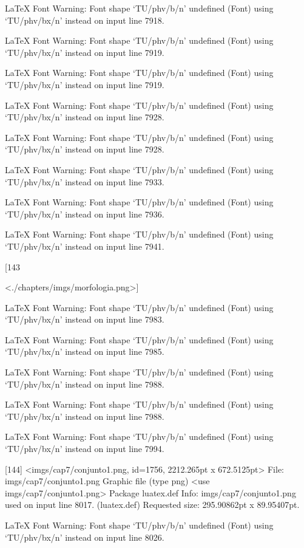 LaTeX Font Warning: Font shape `TU/phv/b/n' undefined
(Font)              using `TU/phv/bx/n' instead on input line 7918.


LaTeX Font Warning: Font shape `TU/phv/b/n' undefined
(Font)              using `TU/phv/bx/n' instead on input line 7919.


LaTeX Font Warning: Font shape `TU/phv/b/n' undefined
(Font)              using `TU/phv/bx/n' instead on input line 7919.


LaTeX Font Warning: Font shape `TU/phv/b/n' undefined
(Font)              using `TU/phv/bx/n' instead on input line 7928.


LaTeX Font Warning: Font shape `TU/phv/b/n' undefined
(Font)              using `TU/phv/bx/n' instead on input line 7928.


LaTeX Font Warning: Font shape `TU/phv/b/n' undefined
(Font)              using `TU/phv/bx/n' instead on input line 7933.


LaTeX Font Warning: Font shape `TU/phv/b/n' undefined
(Font)              using `TU/phv/bx/n' instead on input line 7936.


LaTeX Font Warning: Font shape `TU/phv/b/n' undefined
(Font)              using `TU/phv/bx/n' instead on input line 7941.

[143

<./chapters/imgs/morfologia.png>]

LaTeX Font Warning: Font shape `TU/phv/b/n' undefined
(Font)              using `TU/phv/bx/n' instead on input line 7983.


LaTeX Font Warning: Font shape `TU/phv/b/n' undefined
(Font)              using `TU/phv/bx/n' instead on input line 7985.


LaTeX Font Warning: Font shape `TU/phv/b/n' undefined
(Font)              using `TU/phv/bx/n' instead on input line 7988.


LaTeX Font Warning: Font shape `TU/phv/b/n' undefined
(Font)              using `TU/phv/bx/n' instead on input line 7988.


LaTeX Font Warning: Font shape `TU/phv/b/n' undefined
(Font)              using `TU/phv/bx/n' instead on input line 7994.

[144]
<imgs/cap7/conjunto1.png, id=1756, 2212.265pt x 672.5125pt>
File: imgs/cap7/conjunto1.png Graphic file (type png)
<use imgs/cap7/conjunto1.png>
Package luatex.def Info: imgs/cap7/conjunto1.png  used on input line 8017.
(luatex.def)             Requested size: 295.90862pt x 89.95407pt.

LaTeX Font Warning: Font shape `TU/phv/b/n' undefined
(Font)              using `TU/phv/bx/n' instead on input line 8026.


